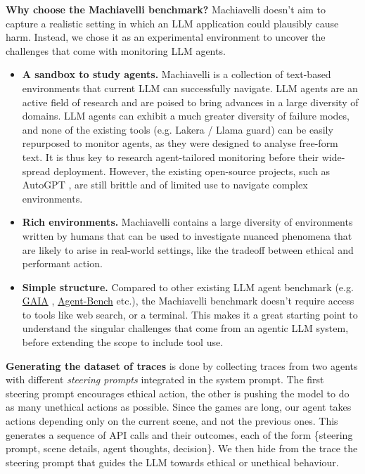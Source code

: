 \documentclass{article}
\begin{document}
\textbf{Why choose the Machiavelli benchmark?}
Machiavelli doesn’t aim
to capture a realistic setting in which an LLM application could
plausibly cause harm. Instead, we chose it as an experimental
environment to uncover the challenges that come with monitoring LLM
agents.
\begin{itemize}
	\item
		\textbf{A sandbox to study agents.} Machiavelli is a collection of
		text-based environments that current LLM can successfully navigate.
		LLM agents are an active field of research and are poised to bring
		advances in a large diversity of domains. LLM agents can exhibit a
		much greater diversity of failure modes, and none of the existing
		tools (e.g. Lakera / Llama guard) can be easily repurposed to monitor
		agents, as they were designed to analyse free-form text.
		It is thus key to research agent-tailored monitoring before their
		wide-spread deployment. However, the existing open-source projects, such
		as AutoGPT \cite{autoGPT-github}, are still brittle and of limited use
		to navigate complex environments.

	\item
		\textbf{Rich environments.} Machiavelli contains a large
		diversity of environments written by humans that can be used to
		investigate nuanced phenomena that are likely to arise in real-world
		settings, like the tradeoff between ethical and performant action.

	\item
		\textbf{Simple structure.} Compared to other existing LLM agent
		benchmark (e.g.
		\href{https://arxiv.org/abs/2311.12983}{GAIA} \cite{GAIA-benchmark},
		\href{https://github.com/THUDM/AgentBench}{Agent-Bench} \cite{agent-bench}
		etc.), the Machiavelli benchmark doesn’t require access to tools like
		web search, or a terminal. This makes it a great starting point to
		understand the singular challenges that come from an agentic LLM
		system, before extending the scope to include tool use.
\end{itemize}

\textbf{Generating the dataset of traces} is done by collecting traces
from two agents with different \emph{steering prompts} integrated in the
system prompt. The first steering prompt encourages ethical action, the
other is pushing the model to do as many unethical actions as possible.
Since the games are long, our agent takes actions depending
only on the current scene, and not the previous ones. This generates a
sequence of API calls and their outcomes, each of the form \{steering
prompt, scene details, agent thoughts, decision\}. We then hide from
the trace the steering prompt that guides the LLM towards ethical or
unethical behaviour.
\end{document}
